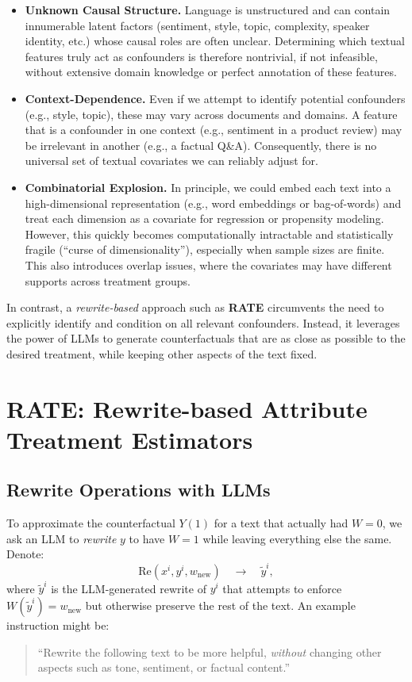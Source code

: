 \begin{itemize}
    \item \textbf{Unknown Causal Structure.} Language is unstructured and can contain innumerable latent factors (sentiment, style, topic, complexity, speaker identity, etc.) whose causal roles are often unclear. Determining which textual features truly act as confounders is therefore nontrivial, if not infeasible, without extensive domain knowledge or perfect annotation of these features.

    \item \textbf{Context-Dependence.} Even if we attempt to identify potential confounders (e.g., style, topic), these may vary across documents and domains. A feature that is a confounder in one context (e.g., sentiment in a product review) may be irrelevant in another (e.g., a factual Q\&A). Consequently, there is no universal set of textual covariates we can reliably adjust for.

    \item \textbf{Combinatorial Explosion.} In principle, we could embed each text into a high-dimensional representation (e.g., word embeddings or bag-of-words) and treat each dimension as a covariate for regression or propensity modeling. However, this quickly becomes computationally intractable and statistically fragile (``curse of dimensionality''), especially when sample sizes are finite. This also introduces overlap issues, where the covariates may have different supports across treatment groups.

\end{itemize}

In contrast, a \emph{rewrite-based} approach such as \textbf{RATE} circumvents the need to explicitly identify and condition on all relevant confounders. Instead, it leverages the power of LLMs to generate counterfactuals that are as close as possible to the desired treatment, while keeping other aspects of the text fixed.

\section{RATE: Rewrite-based Attribute Treatment Estimators}
\label{sec:rate}

\subsection{Rewrite Operations with LLMs}
To approximate the counterfactual $Y(1)$ for a text that actually had $W=0$, we ask an LLM to \emph{rewrite} $y$ to have $W=1$ while leaving everything else the same. Denote:
\[
\text{Re}(x^i, y^{i}, w_{\text{new}}) \quad\longrightarrow\quad \tilde{y}^{i},
\]
where $\tilde{y}^{i}$ is the LLM-generated rewrite of $y^{i}$ that attempts to enforce $W(\tilde{y}^{i}) = w_{\text{new}}$ but otherwise preserve the rest of the text. An example instruction might be:
\begin{quote}
``Rewrite the following text to be more helpful, \textit{without} changing other aspects such as tone, sentiment, or factual content.''
\end{quote}

